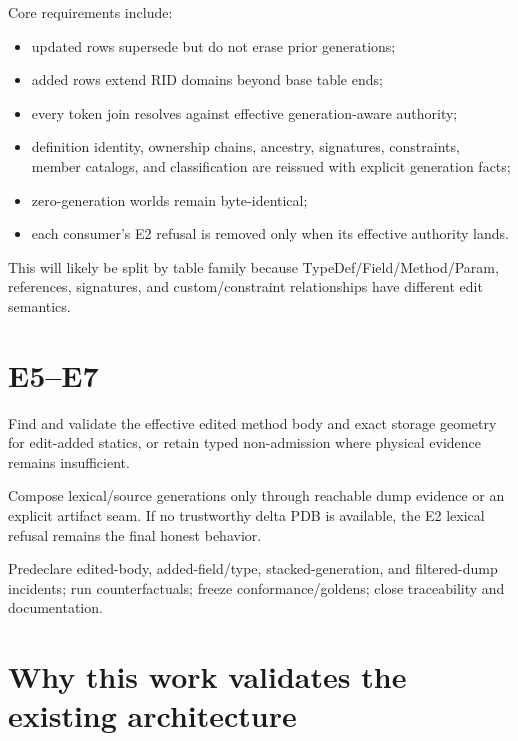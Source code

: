 \documentclass[11pt,oneside,openany]{book}
\begin{document}
Core requirements include:

\begin{itemize}
  \item updated rows supersede but do not erase prior generations;
  \item added rows extend RID domains beyond base table ends;
  \item every token join resolves against effective generation-aware authority;
  \item definition identity, ownership chains, ancestry, signatures, constraints, member catalogs, and classification are reissued with explicit generation facts;
  \item zero-generation worlds remain byte-identical;
  \item each consumer's E2 refusal is removed only when its effective authority lands.
\end{itemize}

This will likely be split by table family because TypeDef/Field/Method/Param, references, signatures, and custom/constraint relationships have different edit semantics.

\section{E5--E7}

\begin{description}[style=nextline]
  \item[E5: effective IL and edit-added storage] Find and validate the effective edited method body and exact storage geometry for edit-added statics, or retain typed non-admission where physical evidence remains insufficient.
  \item[E6: Portable-PDB deltas] Compose lexical/source generations only through reachable dump evidence or an explicit artifact seam. If no trustworthy delta PDB is available, the E2 lexical refusal remains the final honest behavior.
  \item[E7: corpus and closure] Predeclare edited-body, added-field/type, stacked-generation, and filtered-dump incidents; run counterfactuals; freeze conformance/goldens; close traceability and documentation.
\end{description}

\section{Why this work validates the existing architecture}
\end{document}

